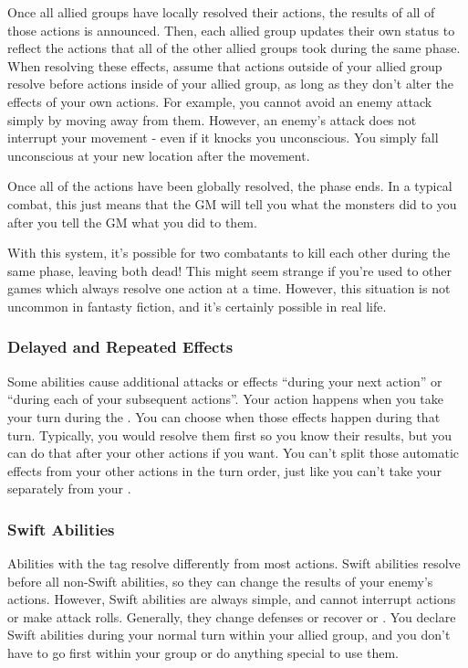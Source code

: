         Once all allied groups have locally resolved their actions, the results of all of those actions is announced.
        Then, each allied group updates their own status to reflect the actions that all of the other allied groups took during the same phase.
        When resolving these effects, assume that actions outside of your allied group resolve before actions inside of your allied group, as long as they don't alter the effects of your own actions.
        For example, you cannot avoid an enemy attack simply by moving away from them.
        However, an enemy's attack does not interrupt your movement - even if it knocks you unconscious.
        You simply fall unconscious at your new location after the movement.

        Once all of the actions have been globally resolved, the phase ends.
        In a typical combat, this just means that the GM will tell you what the monsters did to you after you tell the GM what you did to them.

        With this system, it's possible for two combatants to kill each other during the same phase, leaving both dead!
        This might seem strange if you're used to other games which always resolve one action at a time.
        However, this situation is not uncommon in fantasty fiction, and it's certainly possible in real life.

        \subsubsection{Delayed and Repeated Effects}
            Some abilities cause additional attacks or effects ``during your next action'' or ``during each of your subsequent actions''.
            Your action happens when you take your turn during the .
            You can choose when those effects happen during that turn.
            Typically, you would resolve them first so you know their results, but you can do that after your other actions if you want.
            You can't split those automatic effects from your other actions in the turn order, just like you can't take your  separately from your .

        \subsubsection{Swift Abilities}\label{Swift Abilities}
            Abilities with the  tag resolve differently from most actions.
            Swift abilities resolve before all non-Swift abilities, so they can change the results of your enemy's actions.
            However, Swift abilities are always simple, and cannot interrupt actions or make attack rolls.
            Generally, they change defenses or recover  or .
            You declare Swift abilities during your normal turn within your allied group, and you don't have to go first within your group or do anything special to use them.

